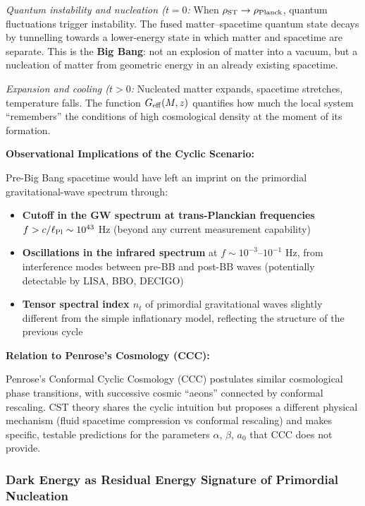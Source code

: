 \documentclass[11pt,a4paper]{article}
\providecommand{\tightlist}{\setlength{\itemsep}{0pt}\setlength{\parskip}{0pt}}
\begin{document}
\emph{Quantum instability and nucleation (\(t = 0\):} When
\(\rho_{\rm ST} \to \rho_{\rm Planck}\), quantum fluctuations trigger
instability. The fused matter--spacetime quantum state decays by
tunnelling towards a lower-energy state in which matter and spacetime
are separate. This is the \textbf{Big Bang}: not an explosion of matter
into a vacuum, but a nucleation of matter from geometric energy in an
already existing spacetime.

\emph{Expansion and cooling (\(t > 0\):} Nucleated matter expands,
spacetime stretches, temperature falls. The function
\(G_{\rm eff}(M,z)\) quantifies how much the local system ``remembers''
the conditions of high cosmological density at the moment of its
formation.

\textbf{Observational Implications of the Cyclic Scenario:}

Pre-Big Bang spacetime would have left an imprint on the primordial
gravitational-wave spectrum through:

\begin{itemize}
\tightlist
\item
  \textbf{Cutoff in the GW spectrum at trans-Planckian frequencies}
  \(f > c/\ell_{\rm Pl} \sim 10^{43}\) Hz (beyond any current
  measurement capability)
\item
  \textbf{Oscillations in the infrared spectrum} at
  \(f \sim 10^{-3}\)--\(10^{-1}\) Hz, from interference modes between
  pre-BB and post-BB waves (potentially detectable by LISA, BBO, DECIGO)
\item
  \textbf{Tensor spectral index \(n_t\)} of primordial gravitational
  waves slightly different from the simple inflationary model,
  reflecting the structure of the previous cycle
\end{itemize}

\textbf{Relation to Penrose's Cosmology (CCC):}

Penrose's \cite{Penrose2010} Conformal Cyclic Cosmology (CCC) postulates similar
cosmological phase transitions, with successive cosmic ``aeons''
connected by conformal rescaling. CST theory shares the cyclic intuition
but proposes a different physical mechanism (fluid spacetime compression
vs conformal rescaling) and makes specific, testable predictions for the
parameters \(\alpha\), \(\beta\), \(a_0\) that CCC does not provide.

\subsubsection{Dark Energy as Residual Energy Signature of Primordial Nucleation}
\end{document}
